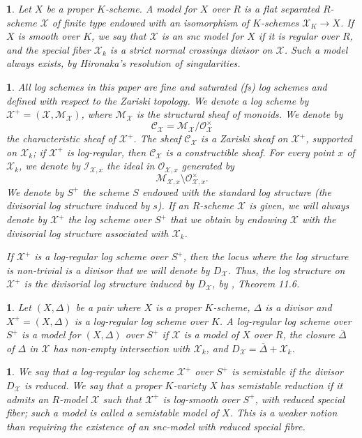 \documentclass{amsart}%
\numberwithin{equation}{subsection}
\theoremstyle{plain2}
\theoremstyle{definition2}
\theoremstyle{stepstyle}
\theoremstyle{point}
\theoremstyle{subpoint}
\newtheorem{subpoint}[equation]{}%
\newcommand{\spa}[1]{\begin{subpoint}#1\end{subpoint}}           %
\newcommand{\cX}{\ensuremath{\mathscr{X}}}
\newcommand{\caM}{\ensuremath{\mathcal{M}}}
\newcommand{\caC}{\ensuremath{\mathcal{C}}}
\begin{document}
\spa{Let $X$ be a proper $K$-scheme. A model for $X$ over $R$ is a flat separated $R$-scheme $\cX$ of finite type endowed with an isomorphism of $K$-schemes $\cX_K \rightarrow X$. If $X$ is smooth over $K$,
we say that $\cX$ is an snc model for $X$ if it is regular over $R$, and the
special fiber $\cX_k$ is a strict normal crossings divisor on $\cX$. Such a model always exists, by Hironaka's resolution of singularities.}

\spa{ \label{sss-log} All log schemes in this paper are  fine and saturated (\emph{fs}) log schemes and defined with respect to the Zariski topology. We denote a log scheme by $\cX^+=(\cX,\caM_{\cX})$, where $\caM_{\cX}$ is the structural sheaf of monoids. We denote by $$\mathcal{C}_{\cX}=\mathcal{M}_{\cX}/\mathcal{O}_{\cX}^{\times}$$
the characteristic sheaf of $\cX^+$. The sheaf $\mathcal{C}_{\cX}$
is a Zariski sheaf on $\cX^+$, supported on $\cX_k$; if $\cX^+$ is log-regular, then $\caC_{\cX}$ is a constructible sheaf.
For every point $x$ of $\cX_k$, we denote by $\mathcal{I}_{\cX,x}$
the ideal in $\mathcal{O}_{\cX,x}$ generated by
$$\mathcal{M}_{\cX,x}\setminus \mathcal{O}_{\cX,x}^{\times}.$$ We denote
by $S^+$ the scheme $S$ endowed with the standard log structure
(the divisorial log structure induced by $s$). If an $R$-scheme $\cX$ is given, we will always denote by $\cX^+$ the log scheme over $S^+$ that we obtain by endowing $\cX$ with the divisorial log structure associated with
$\cX_k$.

If $\cX^+$ is a log-regular log scheme over $S^+$, then the locus where the log structure is non-trivial is a divisor that we will denote by $D_{\cX}$. Thus, the log structure on $\cX^+$ is the divisorial log structure induced by $D_{\cX}$, by \cite{Kato1994a}, Theorem 11.6.

}

\spa{Let $(X,\Delta)$ be a pair where $X$ is a proper $K$-scheme, $\Delta$ is a divisor and $X^+=(X,\Delta)$ is a log-regular log scheme over $K$. A log-regular log scheme over $S^+$ is a model for $(X,\Delta)$ over $S^+$ if $\cX$ is a model of $X$ over $R$, the closure $\overline{\Delta}$ of $\Delta$ in $\cX$ has non-empty intersection with $\cX_k$, and $D_\cX = \overline{\Delta} + \cX_k$. }

\spa{We say that a log-regular log scheme $\cX^+$ over $S^+$ is semistable if the divisor $D_\cX$ is reduced. We say that a proper $K$-variety X has semistable reduction if it admits an $R$-model $\cX$ such that $\cX^+$ is log-smooth over $S^+$, with reduced special fiber; such a model is called a semistable model of $X$. This is a weaker notion than requiring the existence of an snc-model with reduced special fibre.}
\end{document}
